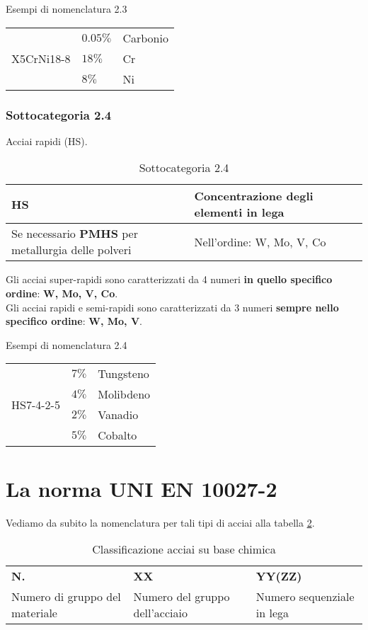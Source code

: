 \begin{example}{Esempi di nomenclatura 2.3}
\begin{tabularx}{\textwidth}{XXX}
\multirow{3}{*}{X5CrNi18-8} & $0.05\%$ & Carbonio\\
	& $18\%$ & Cr\\
	& $8\%$ & Ni\\
\end{tabularx}
\end{example}

\subsubsection{Sottocategoria 2.4}
Acciai rapidi (HS).

\begin{table}
\centering
\caption{Sottocategoria 2.4}\label{tab:Sotto4}
\begin{tabularx}{\textwidth}{|X|X|}
\toprule
\textbf{HS} & \textbf{Concentrazione degli elementi in lega}\\
\midrule
Se necessario \textbf{PMHS} per metallurgia delle polveri &
Nell'ordine: W, Mo, V, Co\\
\bottomrule
\end{tabularx}
\end{table}
Gli acciai super-rapidi sono caratterizzati da 4 numeri \textbf{in quello specifico ordine}: \textbf{W, Mo, V, Co}.\\
Gli acciai rapidi e semi-rapidi sono caratterizzati da 3 numeri \textbf{sempre nello specifico ordine}: \textbf{W, Mo, V}.\\

\begin{example}{Esempi di nomenclatura 2.4}
\begin{tabularx}{\textwidth}{XXX}
\multirow{4}{*}{HS7-4-2-5} & $7\%$ & Tungsteno\\
	& $4\%$ & Molibdeno\\
	& $2\%$ & Vanadio\\
	& $5\%$ & Cobalto\\
\end{tabularx}
\end{example}

\section{La norma UNI EN 10027-2}
Vediamo da subito la nomenclatura per tali tipi di acciai alla tabella \ref{tab:ClassParte2}.
\begin{table}
\centering
\caption{Classificazione acciai su base chimica}
\label{tab:ClassParte2}
\begin{tabularx}{\textwidth}{|X|X|X|}
\toprule
\textbf{N.} & \textbf{XX} & \textbf{YY(ZZ)}\\
Numero di gruppo del materiale & Numero del gruppo dell'acciaio & Numero sequenziale in lega\\
\bottomrule
\end{tabularx}
\end{table}

